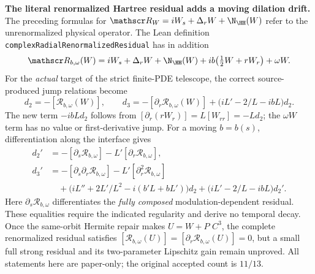 \medskip
\noindent\textbf{The literal renormalized Hartree residual adds a moving dilation drift.}
The preceding formulas for \(\mathscr R_W=iW_s+\Delta_rW+\N_{\HH}(W)\)
refer to the unrenormalized physical operator. The Lean definition
\texttt{complexRadialRenormalizedResidual} has in addition
\[
 \mathscr R_{b,\omega}(W)
 =iW_s+\Delta_rW+\N_{\HH}(W)
   +ib\bigl(\tfrac12W+rW_r\bigr)+\omega W.
\]
For the \emph{actual} target of the strict finite-PDE telescope,
the correct source-produced jump relations become
\begin{equation}
 \boxed{\quad
 d_2=-[\mathscr R_{b,\omega}(W)],\qquad
 d_3=-[\partial_r\mathscr R_{b,\omega}(W)]
          +\bigl(iL'-2/L-ibL\bigr)d_2.
 \quad}\label{eq:hbl-renormalized-source-jet}
\end{equation}
The new term \(-ibLd_2\) follows from
\([\partial_r(rW_r)]=L[W_{rr}]=-Ld_2\);
the \(\omega W\) term has no value or first-derivative jump.
For a moving \(b=b(s)\), differentiation along the interface gives
\begin{align*}
 d_2'&=-[\partial_s\mathscr R_{b,\omega}]
        -L'[\partial_r\mathscr R_{b,\omega}],\\
 d_3'&=-[\partial_s\partial_r\mathscr R_{b,\omega}]
        -L'[\partial_r^2\mathscr R_{b,\omega}]\\
   &\quad+\bigl(iL''+2L'/L^2-i(b'L+bL')\bigr)d_2
        +\bigl(iL'-2/L-ibL\bigr)d_2'.
\end{align*}
Here \(\partial_s\mathscr R_{b,\omega}\) differentiates the
\emph{fully composed} modulation-dependent residual. These
equalities require the indicated regularity and derive no temporal
decay. Once the same-orbit Hermite repair makes \(U=W+P\)
\(C^3\), the complete renormalized residual satisfies
\(
 [\mathscr R_{b,\omega}(U)]
 =[\partial_r\mathscr R_{b,\omega}(U)]=0
\),
but a small full strong residual and its two-parameter
Lipschitz gain remain unproved. All statements here are paper-only;
the original accepted count is \(11/13\).
